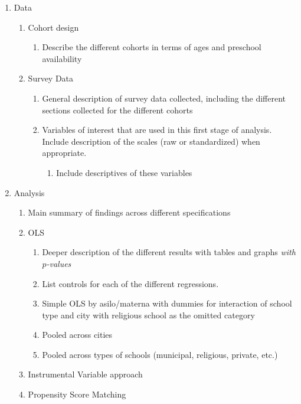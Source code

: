 \documentclass{article}
\begin{document}
\begin{enumerate}
	\item Data
	\begin{enumerate}	
		\item Cohort design
		\begin{enumerate}
			\item Describe the different cohorts in terms of ages and preschool availability
		\end{enumerate}
	\item Survey Data
	\begin{enumerate}
		\item General description of survey data collected, including the different sections collected for the different cohorts
		\item Variables of interest that are used in this first stage of analysis. Include description of the scales (raw or standardized) when appropriate.
		\begin{enumerate}
			\item Include descriptives of these variables 
		\end{enumerate}
	\end{enumerate}
	\end{enumerate}
	
	\item Analysis
	\begin{enumerate}
		\item Main summary of findings across different specifications 
		\item OLS 
		\begin{enumerate}
			\item Deeper description of the different results with tables and graphs \textit{with $p$-values}			
			\item List controls for each of the different regressions. 
			\item Simple OLS by asilo/materna with dummies for interaction of school type and city with religious school as the omitted category 
			\item Pooled across cities 
			\item Pooled across types of  schools (municipal, religious, private, etc.)
		\end{enumerate}
		\item Instrumental Variable approach 
		\item Propensity Score Matching 
	\end{enumerate}
	

\end{enumerate}
\end{document}

